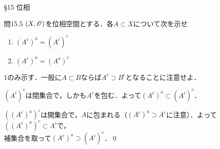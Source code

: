 \documentclass[uplatex,a4paper,dvipdfmx,aspectratio=169,11pt]{beamer}
\begin{document}
\begin{frame}[fragile]{\S 15 位相}
    \begin{exampleblock}{問15.5}
        $(X, \mathscr{O})$を位相空間とする．各$A \subset X$について次を示せ
        \begin{enumerate}
            \item $(A^c)^a = (A^i)^c$
            \item $(A^c)^a = (A^a)^c$
        \end{enumerate}
    \end{exampleblock}

    \medskip{}

     \quad 1のみ示す．一般に$A \subset B$ならば$A^c \supset B^c$となることに注意せよ．
   \begin{description}[$(\subset)$]
       \item[$(\subset)$] $(A^i)^c$は閉集合で，しかも$A^c$を包む．よって$(A^c)^a \subset (A^i)^c$．
       \item[$(\supset)$] $((A^c)^a)^c$は開集合で，$A$に包まれる（$(A^c)^a \supset A^c$に注意）．よって$((A^c)^a)^c \subset A^i$で，\\補集合を取って$(A^c)^a \supset (A^i)^c$．\qed
   \end{description} 

\end{frame}
\end{document}

